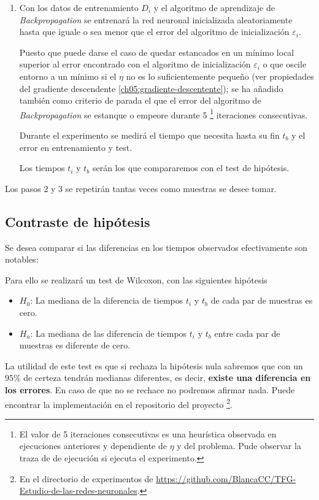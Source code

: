 \begin{enumerate}
\item Con los datos de entrenamiento $D_i$ y el algoritmo de 
aprendizaje de \textit{Backpropagation} se entrenará la red 
neuronal inicializada aleatoriamente hasta que iguale o sea menor que  el 
error del algoritmo de inicialización $\varepsilon_i$. 

Puesto que puede darse el caso de 
quedar estancados en un mínimo local superior al error encontrado con el algoritmo de inicialización $\varepsilon_i$ o que oscile entorno a un 
mínimo si el $\eta$ no es lo suficientemente pequeño (ver 
propiedades del gradiente descendente \ref{ch05:gradiente-descentente}); se ha añadido también como criterio de parada el que el error del algoritmo de \textit{Backpropagation}
se estanque o empeore durante 5 \footnote{El valor de 5 
iteraciones consecutivas es una heurística observada en 
ejecuciones anteriores y dependiente de $\eta$ y del problema.
Pude observar la traza de de ejecución si ejecuta el experimento.} 
iteraciones consecutivas. 

Durante el experimento se medirá el tiempo que necesita hasta su fin $t_b$ y el error en 
entrenamiento y test. 

Los tiempos $t_i$ y $t_b$ serán los que compararemos con el test de hipótesis. 
\end{enumerate}

Los pasos 2 y 3 se repetirán tantas veces como 
muestras se desee tomar. 

\subsection{Contraste de hipótesis}

Se desea comparar si las diferencias en los tiempos observados efectivamente son notables: 

Para ello se realizará un test de Wilcoxon, con las siguientes hipótesis

\begin{itemize}
    \item $H_0$: La mediana de la diferencia de tiempos  $t_i$ y $t_b$ de cada par de muestras es cero. 
    \item $H_a$: La mediana de las diferencia de tiempos  $t_i$ y $t_b$ entre cada par de muestras es diferente de cero. 
\end{itemize}

La utilidad de este test es que si rechaza la hipótesis nula sabremos que con un $95 \%$ de certeza tendrán medianas diferentes, es decir, \textbf{existe una 
diferencia en los errores}. En caso de que no se rechace no podremos afirmar nada.
Puede encontrar la implementación en el repositorio del
 proyecto \footnote{En el directorio de experimentos 
 de \url{https://github.com/BlancaCC/TFG-Estudio-de-las-redes-neuronales}.}.

